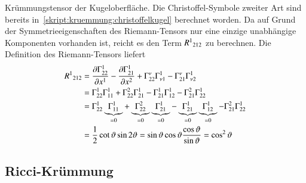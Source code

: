\begin{beispiel}
Krümmungstensor der Kugeloberfläche.
Die Christoffel-Symbole zweiter Art sind bereits
in~\eqref{skript:kruemmung:christoffelkugel}
berechnet worden.
Da auf Grund der Symmetrieeigenschaften des Riemann-Tensors nur eine
einzige unabhängige Komponenten vorhanden ist, reicht es den
Term $R^1\mathstrut_{212}$ zu berechnen.
Die Definition des Riemann-Tensors liefert
\begin{align*}
R^1\mathstrut_{212}
&=
\frac{\partial \Gamma_{22}^1}{\partial x^1}
-
\frac{\partial \Gamma_{21}^1}{\partial x^2}
+
\Gamma_{22}^\nu
\Gamma_{\nu1}^1
-
\Gamma_{21}^\nu
\Gamma_{\nu2}^1
\\
&=
\Gamma_{22}^1
\Gamma_{11}^1
+
\Gamma_{22}^2
\Gamma_{21}^1
-
\Gamma_{21}^1
\Gamma_{12}^1
-
\Gamma_{21}^2
\Gamma_{22}^1
\\
&=
\Gamma_{22}^1
\underbrace{\Gamma_{11}^1}_{=0}
+
\underbrace{\Gamma_{22}^2}_{=0}
\underbrace{\Gamma_{21}^1}_{=0}
-
\underbrace{\Gamma_{21}^1}_{=0}
\underbrace{\Gamma_{12}^1}_{=0}
-
\Gamma_{21}^2
\Gamma_{22}^1
\\
&=\frac12 \cot \vartheta \sin2\vartheta
=\sin\vartheta\cos\vartheta\frac{\cos\vartheta}{\sin\vartheta}
=\cos^2\vartheta
\end{align*}


\end{beispiel}


\subsection{Ricci-Krümmung}

